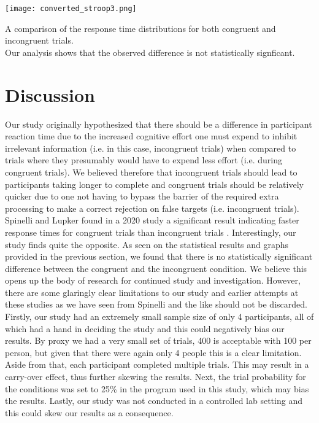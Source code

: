 \documentclass{article}
\begin{document}
\begin{center}
\texttt{[image: converted\_stroop3.png]}
\end{center}

\begin{center}
A comparison of the response time distributions for both congruent and incongruent trials.\\ Our analysis shows that the observed difference is not statistically signficant.
\end{center}

\section{Discussion}
\label{sec:orgac37d64}

\hspace{1em} Our study originally hypothesized that there should be a difference in participant reaction time due to the increased cognitive effort one must expend to inhibit irrelevant information (i.e. in this case, incongruent trials) when compared to trials where they presumably would have to expend less effort (i.e. during congruent trials). We believed therefore that incongruent trials should lead to participants taking longer to complete and congruent trials should be relatively quicker due to one not having to bypass the barrier of the required extra processing to make a correct rejection on false targets (i.e. incongruent trials). Spinelli and Lupker found in a 2020 study a significant result indicating faster response times for congruent trials than incongruent trials \cite{SpinelliGiacomo2020I}. Interestingly, our study finds quite the opposite. As seen on the statistical results and graphs provided in the previous section, we found that there is no statistically significant difference between the congruent and the incongruent condition. We believe this opens up the body of research for continued study and investigation. However, there are some glaringly clear limitations to our study and earlier attempts at these studies as we have seen from Spinelli and the like should not be discarded. Firstly, our study had an extremely small sample size of only 4 participants, all of which had a hand in deciding the study and this could negatively bias our results. By proxy we had a very small set of trials, 400 is acceptable with 100 per person, but given that there were again only 4 people this is a clear limitation. Aside from that, each participant completed multiple trials. This may result in a carry-over effect, thus further skewing the results. Next, the trial probability for the conditions was set to 25\% in the program used in this study, which may bias the results. Lastly, our study was not conducted in a controlled lab setting and this could skew our results as a consequence. 


\end{document}
